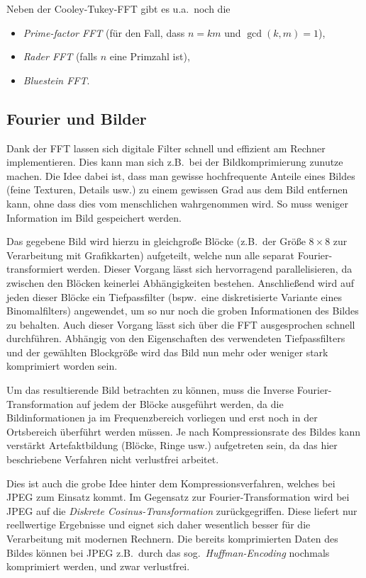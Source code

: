 Neben der Cooley-Tukey-FFT gibt es u.a.\ noch die
\begin{itemize}
\item \emph{Prime-factor FFT} (für den Fall, dass $ n = km $ und $ \gcd(k,m) = 1 $),
\item \emph{Rader FFT} (falls $ n $ eine Primzahl ist),
\item \emph{Bluestein FFT}.
\end{itemize}

\subsection{Fourier und Bilder}

Dank der FFT lassen sich digitale Filter schnell und effizient am Rechner implementieren. Dies kann
man sich z.B.\ bei der Bildkomprimierung zunutze machen. Die Idee dabei ist, dass man gewisse
hochfrequente Anteile eines Bildes (feine Texturen, Details usw.) zu einem gewissen Grad aus dem
Bild entfernen kann, ohne dass dies vom menschlichen wahrgenommen wird. So muss weniger Information
im Bild gespeichert werden.

Das gegebene Bild wird hierzu in gleichgroße Blöcke (z.B.\ der Größe $ 8 \times 8 $ zur 
Verarbeitung mit Grafikkarten) aufgeteilt, welche nun alle separat Fourier-transformiert werden.
Dieser Vorgang lässt sich hervorragend parallelisieren, da zwischen den Blöcken keinerlei 
Abhängigkeiten bestehen. Anschließend wird auf jeden dieser Blöcke ein Tiefpassfilter (bspw.\ eine 
diskretisierte Variante eines Binomalfilters) angewendet, um so nur noch die groben Informationen
des Bildes zu behalten. Auch dieser Vorgang lässt sich über die FFT ausgesprochen schnell 
durchführen. Abhängig von den Eigenschaften des verwendeten Tiefpassfilters und der gewählten 
Blockgröße wird das Bild nun mehr oder weniger stark komprimiert worden sein.

Um das resultierende Bild betrachten zu können, muss die Inverse Fourier-Transformation auf jedem 
der Blöcke ausgeführt werden, da die Bildinformationen ja im Frequenzbereich vorliegen und erst 
noch in der Ortsbereich überführt werden müssen. Je nach Kompressionsrate des Bildes kann verstärkt 
Artefaktbildung (Blöcke, Ringe usw.) aufgetreten sein, da das hier beschriebene Verfahren nicht 
verlustfrei arbeitet.

Dies ist auch die grobe Idee hinter dem Kompressionsverfahren, welches bei JPEG zum Einsatz kommt. 
Im Gegensatz zur Fourier-Transformation wird bei JPEG auf die \emph{Diskrete Cosinus-Transformation}
zurückgegriffen. Diese liefert nur reellwertige Ergebnisse und eignet sich daher wesentlich besser
für die Verarbeitung mit modernen Rechnern. Die bereits komprimierten Daten des Bildes können bei
JPEG z.B.\ durch das sog.\ \emph{Huffman-Encoding} nochmals komprimiert werden, und zwar 
verlustfrei.

